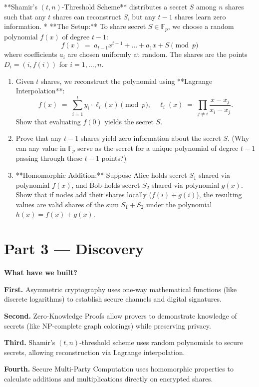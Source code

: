 \documentclass[12pt, a4paper]{book}
\begin{document}
\begin{explobox}
**Shamir's $(t, n)$-Threshold Scheme** distributes a secret $S$ among $n$ shares such that any $t$ shares can reconstruct $S$, but any $t-1$ shares learn zero information.
* **The Setup:**
  To share secret $S \in \mathbb{F}_p$, we choose a random polynomial $f(x)$ of degree $t-1$:
  \[
    f(x) \;=\; a_{t-1} x^{t-1} + \dots + a_1 x + S \pmod p
  \]
  where coefficients $a_i$ are chosen uniformly at random.
  The shares are the points $D_i = (i, f(i))$ for $i = 1, \dots, n$.
\begin{enumerate}[label=(\alph*), leftmargin=*]
  \item Given $t$ shares, we reconstruct the polynomial using **Lagrange Interpolation**:
        \[
          f(x) \;=\; \sum_{i=1}^t y_i \cdot \ell_i(x) \pmod p, \quad \ell_i(x) \;=\; \prod_{j \neq i} \frac{x - x_j}{x_i - x_j}.
        \]
        Show that evaluating $f(0)$ yields the secret $S$.
  \item Prove that any $t-1$ shares yield zero information about the secret $S$. (Why can any value in $\mathbb{F}_p$ serve as the secret for a unique polynomial of degree $t-1$ passing through these $t-1$ points?)
  \item **Homomorphic Addition:** Suppose Alice holds secret $S_1$ shared via polynomial $f(x)$, and Bob holds secret $S_2$ shared via polynomial $g(x)$.
        Show that if nodes add their shares locally ($f(i) + g(i)$), the resulting values are valid shares of the sum $S_1 + S_2$ under the polynomial $h(x) = f(x) + g(x)$.
\end{enumerate}
\end{explobox}

\newpage

\section{Part 3 --- Discovery}

\begin{discoverybox}
\textbf{What have we built?}

\textbf{First.} Asymmetric cryptography uses one-way mathematical functions (like discrete logarithms) to establish secure channels and digital signatures.

\textbf{Second.} Zero-Knowledge Proofs allow provers to demonstrate knowledge of secrets (like NP-complete graph colorings) while preserving privacy.

\textbf{Third.} Shamir's $(t, n)$-threshold scheme uses random polynomials to secure secrets, allowing reconstruction via Lagrange interpolation.

\textbf{Fourth.} Secure Multi-Party Computation uses homomorphic properties to calculate additions and multiplications directly on encrypted shares.
\end{discoverybox}
\end{document}
